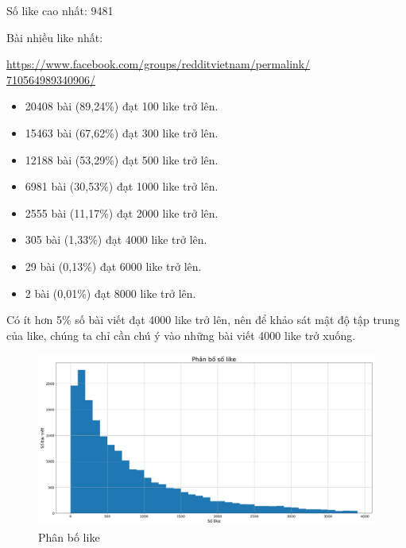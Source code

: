 \documentclass[10pt,a4paper]{article}
\begin{document}
Số like cao nhất: 9481

Bài nhiều like nhất: 

\href{https://www.facebook.com/groups/redditvietnam/permalink/710564989340906/}{https://www.facebook.com/groups/redditvietnam/permalink/\\710564989340906/}

\begin{itemize}
    \item 20408 bài (89,24\%) đạt 100 like trở lên.
    \item 15463 bài (67,62\%) đạt 300 like trở lên.
    \item 12188 bài (53,29\%) đạt 500 like trở lên.
    \item 6981 bài (30,53\%) đạt 1000 like trở lên.
    \item 2555 bài (11,17\%) đạt 2000 like trở lên.
    \item 305 bài (1,33\%) đạt 4000 like trở lên.
    \item 29 bài (0,13\%) đạt 6000 like trở lên.
    \item 2 bài (0,01\%) đạt 8000 like trở lên.
\end{itemize}

Có ít hơn 5\% số bài viết đạt 4000 like trở lên, nên để khảo sát mật độ tập trung của like, chúng ta chỉ cần chú ý vào những bài viết 4000 like trở xuống.
\begin{figure}[hb]
    \centering
    \includegraphics[width=\textwidth]{img/LikesDistribution.png}
    \caption{Phân bố like}
    \label{fig:likesdistribution}
\end{figure}
\end{document}
